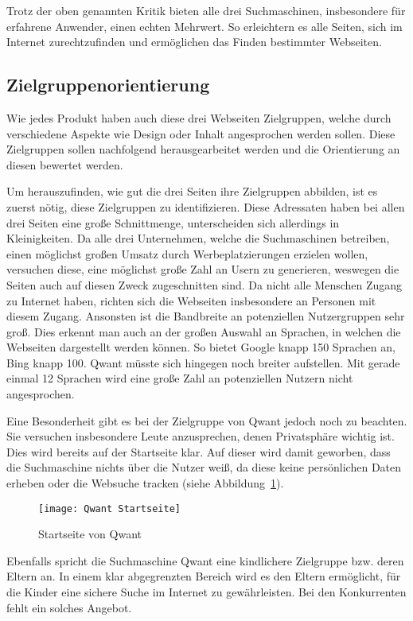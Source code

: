 Trotz der oben genannten Kritik bieten alle drei Suchmaschinen, insbesondere für erfahrene Anwender, einen echten Mehrwert.
So erleichtern es alle Seiten, sich im Internet zurechtzufinden und ermöglichen das Finden bestimmter Webseiten.

\subsection{Zielgruppenorientierung}
Wie jedes Produkt haben auch diese drei Webseiten Zielgruppen, welche durch verschiedene Aspekte wie Design oder Inhalt
angesprochen werden sollen. Diese Zielgruppen sollen nachfolgend herausgearbeitet werden und die Orientierung an diesen
bewertet werden.

Um herauszufinden, wie gut die drei Seiten ihre Zielgruppen abbilden, ist es zuerst nötig, diese Zielgruppen zu
identifizieren. Diese Adressaten haben bei allen drei Seiten eine große Schnittmenge, unterscheiden sich allerdings in
Kleinigkeiten. Da alle drei Unternehmen, welche die Suchmaschinen betreiben, einen möglichst großen Umsatz durch Werbeplatzierungen
erzielen wollen, versuchen diese, eine möglichst große Zahl an Usern zu generieren, weswegen die Seiten auch auf diesen Zweck
zugeschnitten sind.  Da nicht alle Menschen Zugang zu Internet haben, richten sich die Webseiten insbesondere an Personen
mit diesem Zugang. Ansonsten ist die Bandbreite an potenziellen Nutzergruppen sehr groß. Dies erkennt man auch an der großen
Auswahl an Sprachen, in welchen die Webseiten dargestellt werden können. So bietet Google knapp 150 Sprachen an, Bing
knapp 100. Qwant müsste sich hingegen noch breiter aufstellen. Mit gerade einmal 12 Sprachen wird eine große Zahl an
potenziellen Nutzern nicht angesprochen.

Eine Besonderheit gibt es bei der Zielgruppe von Qwant jedoch noch zu beachten. Sie versuchen insbesondere Leute anzusprechen,
denen Privatsphäre wichtig ist. Dies wird bereits auf der Startseite klar. Auf dieser wird damit geworben, dass die Suchmaschine
nichts über die Nutzer weiß, da diese keine persönlichen Daten erheben oder die Websuche tracken (siehe Abbildung~\ref{fig:qwantstartseite}).
\begin{figure}[h]
    \centering
    \texttt{[image: Qwant Startseite]}
    \caption{Startseite von Qwant}
    \label{fig:qwantstartseite}
\end{figure}

Ebenfalls spricht die Suchmaschine Qwant eine kindlichere Zielgruppe bzw. deren Eltern an. In einem klar abgegrenzten
Bereich wird es den Eltern ermöglicht, für die Kinder eine sichere Suche im Internet zu gewährleisten. Bei den Konkurrenten
fehlt ein solches Angebot.

